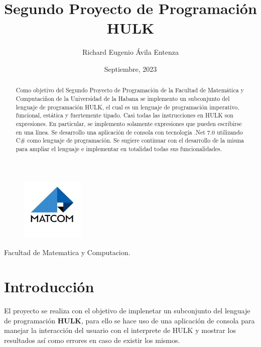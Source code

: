 \documentclass[a4paper,12pt]{article}
\begin{document}
	\title{Segundo Proyecto de Programación HULK}
	\author{Richard Eugenio Ávila Entenza}
	\date{Septiembre, 2023}
	\maketitle
	
	\begin{figure}[h]
		\center
		\includegraphics[width=3cm]{matcom.jpg}
		\label{fig:logo}
	\end{figure}	
	\begin{center}
		\Large Facultad de Matematica y Computacion.
	\end{center}
	
	\newpage
	\begin{abstract}
		Como objetivo del Segundo Proyecto de Programación de la Facultad de Matemática y Computaciñon de la Universidad de la Habana se implemento un subconjunto del lenguaje de programación HULK, el cual es un lenguaje de programación imperativo, funcional, estática y fuertemente tipado. Casi todas las instrucciones en HULK son expresiones. En particular, se implemento solamente expresiones que pueden escribirse en una línea. Se desarrollo una aplicación de consola con tecnología .Net 7.0 utilizando C\# como lenguaje de programación. Se sugiere continuar con el desarrollo de la misma para ampliar el lenguaje e implementar en totalidad todas sus funcionalidades.
	\end{abstract}	
	
	\newpage
	\begin{center}
		\tableofcontents		
	\end{center}
	
	\newpage	
	\section{Introducción}\label{sec:introduccion}
	El proyecto se realiza con el objetivo de implenetar un subconjunto del lenguaje de programación \textbf{HULK}, para ello se hace uso de una aplicación de consola para manejar la interacción del usuario con el interprete de HULK y mostrar los resultados así como errores en caso de existir los mismos.
	
\end{document}
